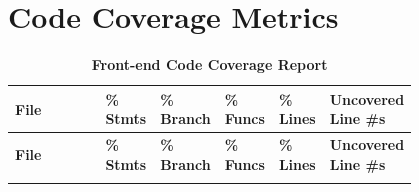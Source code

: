 \documentclass[12pt, titlepage]{article}
\begin{document}
\section{Code Coverage Metrics}
\setcounter{table}{0}
\begin{longtable}{|S{0.3\linewidth} | >{\centering\arraybackslash}p{0.1\linewidth} | >{\centering\arraybackslash}p{0.1\linewidth} | >{\centering\arraybackslash}p{0.1\linewidth} | >{\centering\arraybackslash}p{0.1\linewidth} | U{0.1\linewidth}|}
    \caption{\bf Front-end Code Coverage Report} \label{tab:coverage} \\
      \hline
      \textbf{File} & \textbf{\% Stmts} & \textbf{\% Branch} & \textbf{\% Funcs} & \textbf{\% Lines} & \textbf{Uncovered Line \#s} \\
      \hline
      \endfirsthead
      
      \hline
      \textbf{File} & \textbf{\% Stmts} & \textbf{\% Branch} & \textbf{\% Funcs} & \textbf{\% Lines} & \textbf{Uncovered Line \#s} \\
      \hline
      \endhead
      
      \hline
      \endfoot
      
      \hline
      \endlastfoot


\end{longtable}
\end{document}
